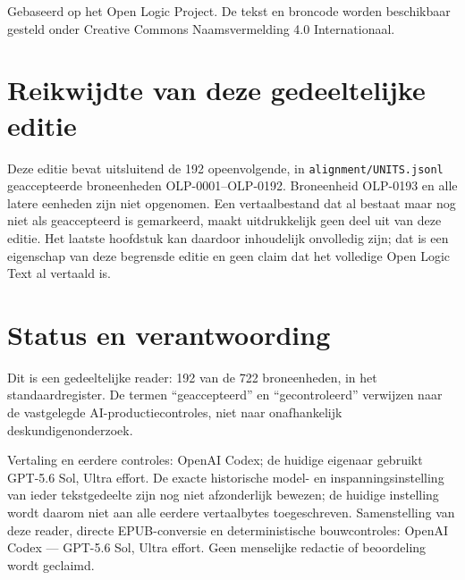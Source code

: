 \documentclass[openany]{memoir}
\begin{document}
\begin{titlingpage}
\vfill
\noindent Gebaseerd op het Open Logic Project. De tekst en broncode worden
beschikbaar gesteld onder Creative Commons Naamsvermelding 4.0 Internationaal.
\end{titlingpage}
\chapter*{Reikwijdte van deze gedeeltelijke editie}
Deze editie bevat uitsluitend de 192 opeenvolgende,
in \texttt{alignment/UNITS.jsonl} geaccepteerde broneenheden OLP-0001--OLP-0192.
Broneenheid OLP-0193 en alle latere eenheden zijn niet opgenomen.
Een vertaalbestand dat al bestaat maar nog niet als geaccepteerd is gemarkeerd,
maakt uitdrukkelijk geen deel uit van deze editie. Het laatste hoofdstuk kan
daardoor inhoudelijk onvolledig zijn; dat is een eigenschap van deze begrensde
editie en geen claim dat het volledige Open Logic Text al vertaald is.
\chapter*{Status en verantwoording}
Dit is een gedeeltelijke reader: 192 van de 722
broneenheden, in het standaardregister. De termen
``geaccepteerd'' en ``gecontroleerd'' verwijzen naar de vastgelegde
AI-productiecontroles, niet naar onafhankelijk deskundigenonderzoek.

Vertaling en eerdere controles: OpenAI Codex; de huidige eigenaar gebruikt GPT-5.6 Sol, Ultra effort. De exacte historische model- en inspanningsinstelling van ieder tekstgedeelte zijn nog niet afzonderlijk bewezen; de huidige instelling wordt daarom niet aan alle eerdere vertaalbytes toegeschreven. Samenstelling van deze reader, directe EPUB-conversie en deterministische bouwcontroles: OpenAI Codex — GPT-5.6 Sol, Ultra effort. Geen menselijke redactie of beoordeling wordt geclaimd.
\tableofcontents*

\begingroup
\def\olfilename{OLP-0001}
\def\olfilepath{content/}
\hypertarget{unit-OLP-0001}{}
\end{document}
